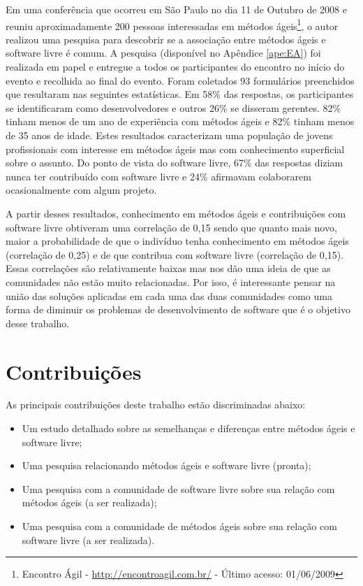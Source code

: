 Em uma conferência que ocorreu em São Paulo no dia 11 de Outubro de
2008 e reuniu aproximadamente 200 pessoas interessadas em métodos
ágeis\footnote{Encontro Ágil - \url{http://encontroagil.com.br/} - Último
  acesso: 01/06/2009}, o autor realizou uma pesquisa para descobrir se
a associação entre métodos ágeis e software livre é comum. A pesquisa
(disponível no Apêndice \ref{ape:EA}) foi realizada em papel e
entregue a todos os participantes do encontro no início do evento e
recolhida ao final do evento. Foram coletados 93 formulários
preenchidos que resultaram nas seguintes estatísticas. %
Em 58\% das respostas, os participantes se identificaram como
desenvolvedores e outros 26\% se disseram gerentes. 82\% tinham menos
de um ano de experiência com métodos ágeis e 82\% tinham menos de 35
anos de idade. Estes resultados caracterizam uma população de jovens
profissionais com interesse em métodos ágeis mas com conhecimento
superficial sobre o assunto. Do ponto de vista do software livre, 67\%
das respostas diziam nunca ter contribuído com software livre e 24\%
afirmavam colaborarem ocasionalmente com algum projeto.

A partir desses resultados, conhecimento em métodos ágeis e
contribuições com software livre obtiveram uma correlação de 0,15
sendo que quanto mais novo, maior a probabilidade de que o indivíduo
tenha conhecimento em métodos ágeis (correlação de 0,25) e de que
contribua com software livre (correlação de 0,15). Essas correlações
são relativamente baixas mas nos dão uma ideia de que as comunidades
não estão muito relacionadas. Por isso, é interessante pensar na união
das soluções aplicadas em cada uma das duas comunidades como uma forma
de diminuir os problemas de desenvolvimento de software que é o
objetivo desse trabalho.

\section{Contribuições}
\label{sec:contribucoes}

As principais contribuições deste trabalho estão discriminadas abaixo:

\begin{itemize}
\item Um estudo detalhado sobre as semelhanças e diferenças entre
  métodos ágeis e software livre;
\item Uma pesquisa relacionando métodos ágeis e software livre
  (pronta);
\item Uma pesquisa com a comunidade de software livre sobre sua
  relação com métodos ágeis (a ser realizada);
\item Uma pesquisa com a comunidade de métodos ágeis sobre sua relação
  com software livre (a ser realizada).
\end{itemize}

